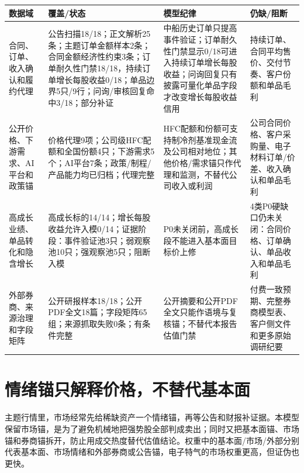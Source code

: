 \begin{exhibitbox}
\scriptsize
\begin{tabularx}{\exhibitboxwidth}{L{2.1cm} L{1.8cm} X X}
\toprule
\textbf{数据域} & \textbf{覆盖/状态} & \textbf{模型纪律} & \textbf{仍缺/阻断} \\
\midrule
合同、订单、收入确认和履约代理 & 公告扫描18/18；正文解析25条；主题订单金额样本2条；合同金额经济性约束3条；订单耐久性门禁18/18，持续订单增长每股收益0/18；单品边界5只/9行；问询/审核回复命中3/18；部分补证 & 中船历史订单只提高事件验证；订单耐久性门禁显示0/18可进入持续订单增长每股收益；问询回复只有披露可量化单品字段才改变增长每股收益信用 & 持续订单、合同平均售价、交付节奏、客户份额和单品毛利 \\
公开价格、下游需求、AI平台和政策锚 & 价格代理9项；公司级HFC配额和全国份额4只；下游需求5个；AI平台7条；政策/制程/产品能力均已归档；代理完整 & HFC配额和份额可支持制冷剂基准现金流及公司相对地位；其他价格/需求锚只作代理和监测，不替代公司收入或利润 & 公司合同价格、客户采购量、电子材料订单/价差、收入确认和单品毛利 \\
高成长业绩、单品转化和隐含增长 & 高成长标的14/14；增长每股收益允许入模0/14；证据阶段：事件验证池3只；弱观察池10只；强观察池5只；阻断入模 & P0未关闭前，高成长段不能进入基本面目标价上修 & 4类P0硬缺口仍未关闭：合同价格、订单确认、单品收入和单品毛利 \\
外部券商、来源治理和字段矩阵 & 公开研报样本18/18；公开PDF全文18篇；字段矩阵65组；来源抓取失败0条；有条件完整 & 公开摘要和公开PDF全文只能作语境与复核锚；不替代本报告估值门禁 & 付费一致预期、完整券商模型表、客户侧文件和更多原始调研纪要 \\
\bottomrule
\end{tabularx}
\end{exhibitbox}

\section{情绪锚只解释价格，不替代基本面}
主题行情里，市场经常先给稀缺资产一个情绪锚，再等公告和财报补证据。本模型保留市场锚，是为了避免机械地把强势股全部判成卖出；同时又把基本面锚、市场锚和券商锚拆开，防止用成交热度替代估值结论。权重中的基本面/市场/外部分别代表基本面、市场情绪和外部券商或公告锚，电子特气的市场权重更高，但证伪也更快。

